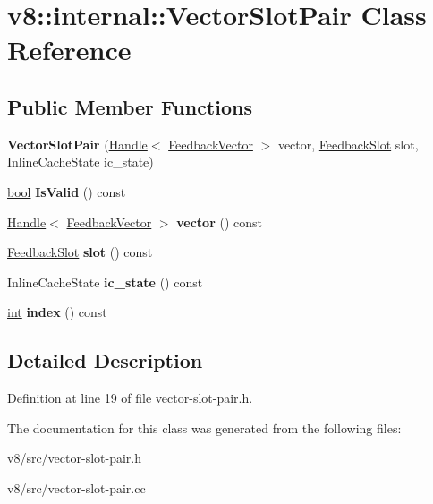 \hypertarget{classv8_1_1internal_1_1VectorSlotPair}{}\section{v8\+:\+:internal\+:\+:Vector\+Slot\+Pair Class Reference}
\label{classv8_1_1internal_1_1VectorSlotPair}
\subsection*{Public Member Functions}
\begin{DoxyCompactItemize}
\item 
\mbox{\label{classv8_1_1internal_1_1VectorSlotPair_a5efbec43c4d607290983980d293ef315}} 
{\bfseries Vector\+Slot\+Pair} (\mbox{\hyperlink{classv8_1_1internal_1_1Handle}{Handle}}$<$ \mbox{\hyperlink{classv8_1_1internal_1_1FeedbackVector}{Feedback\+Vector}} $>$ vector, \mbox{\hyperlink{classv8_1_1internal_1_1FeedbackSlot}{Feedback\+Slot}} slot, Inline\+Cache\+State ic\+\_\+state)
\item 
\mbox{\label{classv8_1_1internal_1_1VectorSlotPair_a510d0ba4fd196fbc0c6a1235d5eb0c6b}} 
\mbox{\hyperlink{classbool}{bool}} {\bfseries Is\+Valid} () const
\item 
\mbox{\label{classv8_1_1internal_1_1VectorSlotPair_a6f221d0df21c8c386e2e877d8aabc1f4}} 
\mbox{\hyperlink{classv8_1_1internal_1_1Handle}{Handle}}$<$ \mbox{\hyperlink{classv8_1_1internal_1_1FeedbackVector}{Feedback\+Vector}} $>$ {\bfseries vector} () const
\item 
\mbox{\label{classv8_1_1internal_1_1VectorSlotPair_ae1c5f214a691b8bfc9c418a082d1cbda}} 
\mbox{\hyperlink{classv8_1_1internal_1_1FeedbackSlot}{Feedback\+Slot}} {\bfseries slot} () const
\item 
\mbox{\label{classv8_1_1internal_1_1VectorSlotPair_a300d9145f2d5718891fa2543ea41b210}} 
Inline\+Cache\+State {\bfseries ic\+\_\+state} () const
\item 
\mbox{\label{classv8_1_1internal_1_1VectorSlotPair_a834684c66200653c8742863200b68cd6}} 
\mbox{\hyperlink{classint}{int}} {\bfseries index} () const
\end{DoxyCompactItemize}


\subsection{Detailed Description}


Definition at line 19 of file vector-\/slot-\/pair.\+h.



The documentation for this class was generated from the following files\+:\begin{DoxyCompactItemize}
\item 
v8/src/vector-\/slot-\/pair.\+h\item 
v8/src/vector-\/slot-\/pair.\+cc\end{DoxyCompactItemize}
